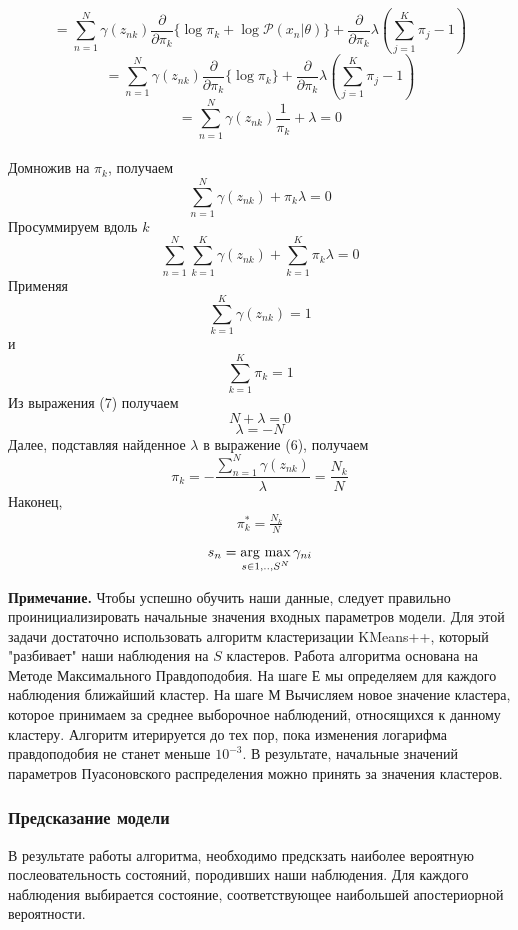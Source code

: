 \documentclass{matmex-diploma}
\begin{document}
$$ = \sum_{n=1}^N
\gamma(z_{nk})\frac{\partial}{\partial \pi_k}\{\log \pi_k + \log \mathcal{P}(x_n|\theta)\} + \frac{\partial}{\partial \pi_k} \lambda(\sum_{j=1}^K \pi_j - 1)$$
$$=\sum_{n=1}^N
\gamma(z_{nk})\frac{\partial}{\partial \pi_k}\{\log \pi_k\} + \frac{\partial}{\partial \pi_k} \lambda(\sum_{j=1}^K \pi_j - 1) $$
$$=\sum_{n=1}^N
\gamma(z_{nk})\frac{1}{\pi_k} + \lambda = 0$$
\\
Домножив на $\pi_k$, получаем
\begin{equation}
\sum_{n=1}^N \gamma(z_{nk}) + \pi_k \lambda = 0
\end{equation}
Просуммируем вдоль $k$
\begin{equation}
\sum_{n=1}^N \sum_{k=1}^K \gamma(z_{nk}) + \sum_{k=1}^K \pi_k \lambda = 0
\end{equation}
Применяя
$$\sum_{k=1}^K \gamma(z_{nk}) = 1$$
и
$$\sum_{k=1}^K \pi_k = 1$$
Из выражения (7) получаем
$$N + \lambda = 0$$
$$\lambda = -N$$
Далее, подставляя найденное $\lambda$ в выражение (6), получаем
$$\pi_k = - \frac{\sum_{n=1}^N\gamma(z_{nk})}{\lambda} = \frac{N_k}{N}$$
Наконец,
\begin{align*}
\pi_{k}^* = \frac{N_k}{N} 
\end{align*}

$$s_n = \mathop{\rm arg~max}\limits_{s \in {1,..,S}^N} {\gamma_{ni}} $$

\textbf{Примечание.} Чтобы успешно обучить наши данные, следует правильно проинициализировать начальные значения входных параметров модели. Для этой задачи достаточно использовать алгоритм кластеризации KMeans++, который "разбивает" наши наблюдения на $S$ кластеров. Работа алгоритма основана на Методе Максимального Правдоподобия. На шаге Е мы определяем для каждого наблюдения ближайший кластер. На шаге М Вычисляем новое значение кластера, которое принимаем за среднее выборочное наблюдений, относящихся к данному кластеру. Алгоритм итерируется до тех пор, пока изменения логарифма правдоподобия не станет меньше $10^{-3}$. В результате, начальные значений параметров Пуасоновского распределения можно принять за значения кластеров.

\subsubsection{Предсказание модели}

В результате работы алгоритма, необходимо предскзать наиболее вероятную послеовательность состояний, породивших наши наблюдения.
Для каждого наблюдения выбирается состояние, соответствующее наибольшей апостериорной вероятности.
\end{document}
